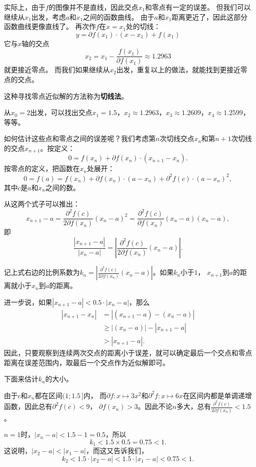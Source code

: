 \documentclass[12pt,UTF8]{ctexbook}
\begin{document}
实际上，由于$f$的图像并不是直线，因此交点$x_1$和零点有一定的误差。
但我们可以继续从$x_1$出发，考虑$a$和$x_1$之间的函数曲线。
由于$a$和$x_1$距离更近了，因此这部分函数曲线更像直线了。
再次作$f$在$x=x_1$处的切线：
$$ y = \partial f(x_1)\cdot (x - x_1) + f(x_1) $$
它与$x$轴的交点
$$ x_2 = x_1 - \frac{f(x_1)}{\partial f(x_1)} \approx 1.2963 $$
就更接近零点。
而我们如果继续从$x_2$出发，重复以上的做法，就能找到更接近零点的交点。

这种寻找零点近似解的方法称为\textbf{切线法}。

从$x_0=2$出发，可以找出交点$x_1 = 1.5$，$x_2 \approx 1.2963$，$x_3 \approx 1.2609$，$x_4 \approx 1.2599$，等等。

如何估计这些点和零点之间的误差呢？我们考虑第$n$次切线交点$x_n$和第$n+1$次切线的交点$x_{n+1}$。按定义：
$$ 0 = f(x_n) + \partial f(x_n)\cdot (x_{n+1} - x_n). $$
按零点的定义，把函数在$x_n$处展开：
$$ 0 = f(a) = f(x_n) + \partial f(x_n)\cdot (a - x_n) + \partial^2 f(c)\cdot (a - x_n)^2, $$
其中$c$是$a$和$x_n$之间的数。

从这两个式子可以推出：
$$ x_{n+1} - a = \frac{\partial^2 f(c)}{2\partial f(x_n)} (x_n - a)^2 = \frac{\partial^2 f(c)}{\partial f(x_n)} (x_n - a)(x_n - a),$$
即
$$ \frac{\left| x_{n+1} - a \right|}{\left| x_n - a \right|} = \left| \frac{\partial^2 f(c)}{2\partial f(x_n)} (x_n - a)\right|.$$

记上式右边的比例系数为$k_n =  \left|\frac{\partial^2 f(c)}{2\partial f(x_n)} (x_n - a)\right|$。如果$k_n$小于$1$，
$x_{n+1}$到$a$的距离就小于$x_n$到$a$的距离。

进一步说，如果$\left| x_{n+1} - a \right| < 0.5 \cdot \left| x_n - a \right|$，那么
\begin{align*}
    \left| x_{n+1} - x_n \right| &= \left| (x_{n+1} - a) - (x_n - a) \right| \\
    &\geqslant  \left| (x_n - a) \right| - \left| x_{n+1} - a \right| \\
    &> \left| x_{n+1} - a \right|.
\end{align*}
因此，只要观察到连续两次交点的距离小于误差，就可以确定最后一个交点和零点距离在误差范围内，取最后一个交点作为近似解即可。

下面来估计$k_n$的大小。

由于$c$和$x_n$都在区间$(1;1.5\,]$内，
而$\partial f: x\mapsto 3x^2$和$\partial^2 f: x\mapsto 6x$在区间内都是单调递增函数，因此总有$\partial^2 f(c) < 9$，
$\partial f(x_n) > 3$。因此不论$n$多大，总有$\frac{\partial^2 f(c)}{2\partial f(x_n)} < 1.5$。

$n=1$时，$|x_n - a| < 1.5 - 1 = 0.5$，所以
$$k_1 < 1.5 \times 0.5 = 0.75 < 1.$$
这说明，$|x_2 - a| < |x_1 - a|$，而这又告诉我们，
$$k_2 < 1.5 \cdot |x_2 - a| < 1.5 \cdot |x_1 - a| <0.75 < 1.$$
\end{document}
